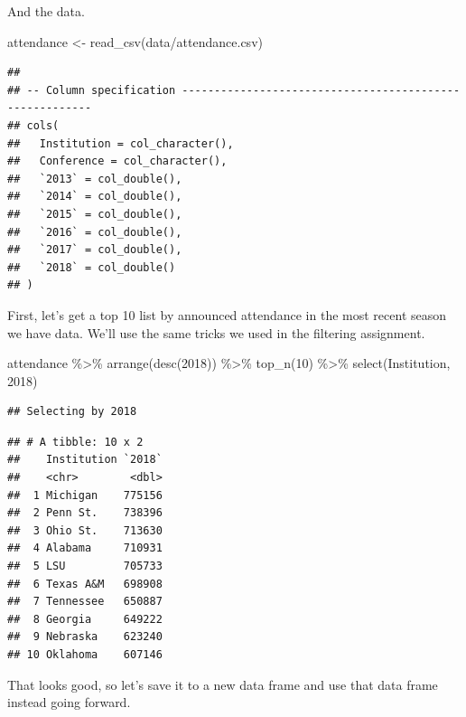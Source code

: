 \documentclass[
]{book}
\newenvironment{Shaded}{\begin{snugshade}}{\end{snugshade}}
\newcommand{\AttributeTok}[1]{\textcolor[rgb]{0.77,0.63,0.00}{#1}}
\newcommand{\DecValTok}[1]{\textcolor[rgb]{0.00,0.00,0.81}{#1}}
\newcommand{\FunctionTok}[1]{\textcolor[rgb]{0.00,0.00,0.00}{#1}}
\newcommand{\NormalTok}[1]{#1}
\newcommand{\OtherTok}[1]{\textcolor[rgb]{0.56,0.35,0.01}{#1}}
\newcommand{\SpecialCharTok}[1]{\textcolor[rgb]{0.00,0.00,0.00}{#1}}
\newcommand{\StringTok}[1]{\textcolor[rgb]{0.31,0.60,0.02}{#1}}
\begin{document}
And the data.

\begin{Shaded}
\begin{Highlighting}[]
\NormalTok{attendance }\OtherTok{\textless{}{-}} \FunctionTok{read\_csv}\NormalTok{(}\StringTok{\textquotesingle{}data/attendance.csv\textquotesingle{}}\NormalTok{)}
\end{Highlighting}
\end{Shaded}

\begin{verbatim}
## 
## -- Column specification --------------------------------------------------------
## cols(
##   Institution = col_character(),
##   Conference = col_character(),
##   `2013` = col_double(),
##   `2014` = col_double(),
##   `2015` = col_double(),
##   `2016` = col_double(),
##   `2017` = col_double(),
##   `2018` = col_double()
## )
\end{verbatim}

First, let's get a top 10 list by announced attendance in the most recent season we have data. We'll use the same tricks we used in the filtering assignment.

\begin{Shaded}
\begin{Highlighting}[]
\NormalTok{attendance }\SpecialCharTok{\%\textgreater{}\%} 
  \FunctionTok{arrange}\NormalTok{(}\FunctionTok{desc}\NormalTok{(}\StringTok{\textasciigrave{}}\AttributeTok{2018}\StringTok{\textasciigrave{}}\NormalTok{)) }\SpecialCharTok{\%\textgreater{}\%} 
  \FunctionTok{top\_n}\NormalTok{(}\DecValTok{10}\NormalTok{) }\SpecialCharTok{\%\textgreater{}\%} 
  \FunctionTok{select}\NormalTok{(Institution, }\StringTok{\textasciigrave{}}\AttributeTok{2018}\StringTok{\textasciigrave{}}\NormalTok{)}
\end{Highlighting}
\end{Shaded}

\begin{verbatim}
## Selecting by 2018
\end{verbatim}

\begin{verbatim}
## # A tibble: 10 x 2
##    Institution `2018`
##    <chr>        <dbl>
##  1 Michigan    775156
##  2 Penn St.    738396
##  3 Ohio St.    713630
##  4 Alabama     710931
##  5 LSU         705733
##  6 Texas A&M   698908
##  7 Tennessee   650887
##  8 Georgia     649222
##  9 Nebraska    623240
## 10 Oklahoma    607146
\end{verbatim}

That looks good, so let's save it to a new data frame and use that data frame instead going forward.
\end{document}
